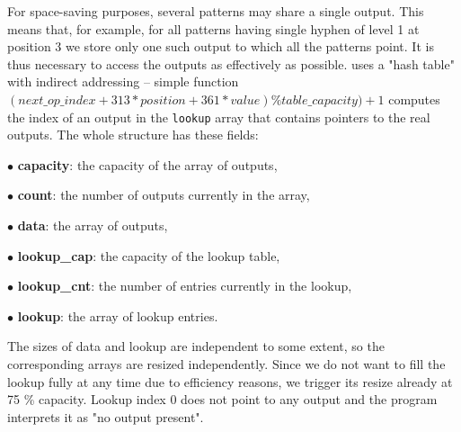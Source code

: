 For space-saving purposes, several patterns may share a single output. This
means that, for example, for all patterns
having single hyphen of level 1 at position 3 we store only one such output to
which all the patterns point. It is thus
necessary to access the outputs as effectively as possible. \utfpatgen{} uses a
"hash table" with indirect addressing --
simple function $(next\_op\_index + 313*position + 361*value) \% table%
\_capacity) + 1$ computes the index of an output
in the {\tt lookup} array that contains pointers to the real outputs. The whole
structure has these fields:

\item{$\bullet$} {\bf capacity}: the capacity of the array of outputs,
\item{$\bullet$} {\bf count}: the number of outputs currently in the array,
\item{$\bullet$} {\bf data}: the array of outputs,
\item{$\bullet$} {\bf lookup\_cap}: the capacity of the lookup table,
\item{$\bullet$} {\bf lookup\_cnt}: the number of entries currently in the
lookup,
\item{$\bullet$} {\bf lookup}: the array of lookup entries.

The sizes of data and lookup are independent to some extent, so the
corresponding arrays are resized independently.
Since we do not want to fill the lookup fully at any time due to efficiency
reasons, we trigger its resize already at
75 \% capacity. Lookup index 0 does not point to any output and the program
interprets it as "no output present".

